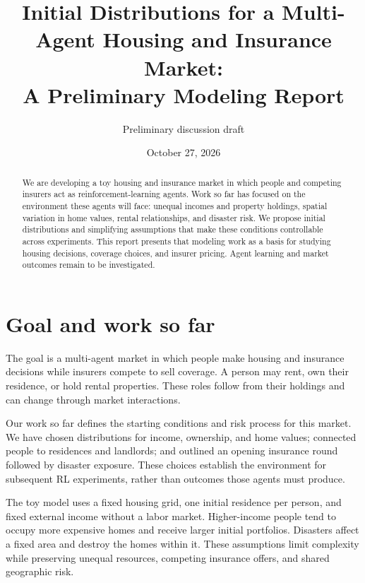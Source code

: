 \documentclass[11pt]{article}
\title{Initial Distributions for a Multi-Agent Housing and Insurance Market:\\A Preliminary Modeling Report}
\author{Preliminary discussion draft}
\date{October 27, 2026}
\begin{document}
\maketitle

\begin{abstract}
We are developing a toy housing and insurance market in which people and competing insurers act as reinforcement-learning agents. Work so far has focused on the environment these agents will face: unequal incomes and property holdings, spatial variation in home values, rental relationships, and disaster risk. We propose initial distributions and simplifying assumptions that make these conditions controllable across experiments. This report presents that modeling work as a basis for studying housing decisions, coverage choices, and insurer pricing. Agent learning and market outcomes remain to be investigated.
\end{abstract}

\section{Goal and work so far}
The goal is a multi-agent market in which people make housing and insurance decisions while insurers compete to sell coverage. A person may rent, own their residence, or hold rental properties. These roles follow from their holdings and can change through market interactions.

Our work so far defines the starting conditions and risk process for this market. We have chosen distributions for income, ownership, and home values; connected people to residences and landlords; and outlined an opening insurance round followed by disaster exposure. These choices establish the environment for subsequent RL experiments, rather than outcomes those agents must produce.

The toy model uses a fixed housing grid, one initial residence per person, and fixed external income without a labor market. Higher-income people tend to occupy more expensive homes and receive larger initial portfolios. Disasters affect a fixed area and destroy the homes within it. These assumptions limit complexity while preserving unequal resources, competing insurance offers, and shared geographic risk.
\end{document}
